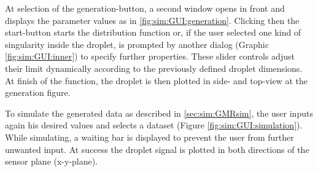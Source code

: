 At selection of the generation-button, a second window opens in front and displays the parameter values as in \ref{fig:sim:GUI:generation}. Clicking then the start-button starts the distribution function or, if the user selected one kind of singularity inside the droplet, is prompted by another dialog (Graphic \ref{fig:sim:GUI:inner}) to specify further properties. These slider controls adjust their limit dynamically according to the previously defined droplet dimensions. At finish of the function, the droplet is then plotted in side- and top-view at the generation figure.

To simulate the generated data as described in \ref{sec:sim:GMRsim}, the user inputs again his desired values and selects a dataset (Figure \ref{fig:sim:GUI:simulation}). While simulating, a waiting bar is displayed to prevent the user from further unwanted input. At success the droplet signal is plotted in both directions of the sensor plane (x-y-plane). 

